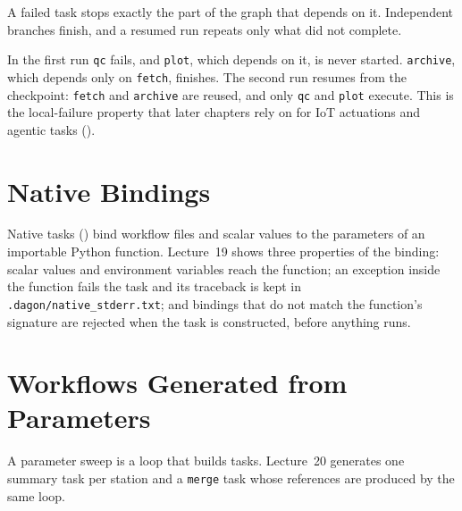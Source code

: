 A failed task stops exactly the part of the graph that depends on it.
Independent branches finish, and a resumed run repeats only what did not
complete.





In the first run \texttt{qc} fails, and \texttt{plot}, which depends on it,
is never started. \texttt{archive}, which depends only on \texttt{fetch},
finishes. The second run resumes from the checkpoint: \texttt{fetch} and
\texttt{archive} are reused, and only \texttt{qc} and \texttt{plot} execute.
This is the local-failure property that later chapters rely on for IoT
actuations and agentic tasks ().

\section{Native Bindings}

Native tasks () bind workflow files and scalar values
to the parameters of an importable Python function. Lecture~19 shows three
properties of the binding: scalar values and environment variables reach the
function; an exception inside the function fails the task and its traceback is
kept in \texttt{.dagon/native\_stderr.txt}; and bindings that do not match the
function's signature are rejected when the task is constructed, before
anything runs.



\section{Workflows Generated from Parameters}

A parameter sweep is a loop that builds tasks. Lecture~20 generates one summary task per
station and a \texttt{merge} task whose references are produced by the same loop.



